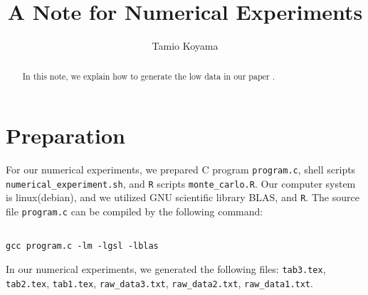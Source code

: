 \documentclass[12pt]{article}
\title{A Note for Numerical Experiments}
\author{Tamio Koyama}
\date{}
\begin{document}
\maketitle

\begin{abstract}
In this note, we explain how to generate the low data in our paper
\cite{2015koyama2}.
\end{abstract}

\section{Preparation}
For our numerical experiments, we prepared 
C program {\tt program.c}, 
shell scripts \\{\tt numerical\_experiment.sh}, 
and {\tt R} scripts {\tt monte\_carlo.R}.
Our computer system is linux(debian), and we utilized GNU scientific library
BLAS, and {\tt R}.
The source file {\tt program.c} can be compiled by the following command:
\begin{lstlisting}[style=BashInputStyle]

gcc program.c -lm -lgsl -lblas
\end{lstlisting}

 
In our numerical experiments, we generated the following files:
{\tt tab3.tex}, 
{\tt tab2.tex}, 
{\tt tab1.tex}, 
{\tt raw\_data3.txt}, 
{\tt raw\_data2.txt}, 
{\tt raw\_data1.txt}.
\end{document}
